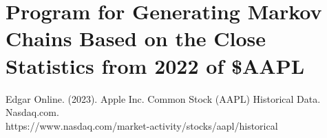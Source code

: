 \documentclass[12pt,final]{article}
\begin{document}
\section{Program for Generating Markov Chains Based on the Close Statistics from 2022 of \$AAPL}



\begin{thebibliography}{9}
Edgar Online. (2023). Apple Inc. Common Stock (AAPL) Historical Data. Nasdaq.com. \\
  https://www.nasdaq.com/market-activity/stocks/aapl/historical

\end{thebibliography}
\end{document}
